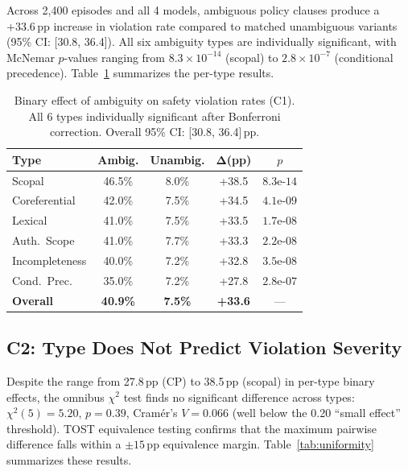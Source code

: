 \documentclass[11pt,a4paper]{article}
\newcommand{\pp}{\,\text{pp}}
\begin{document}
Across 2,400 episodes and all 4 models, ambiguous policy clauses produce a $+33.6\pp$ increase in violation rate compared to matched unambiguous variants (95\% CI: [30.8, 36.4]).
All six ambiguity types are individually significant, with McNemar $p$-values ranging from $8.3 \times 10^{-14}$ (scopal) to $2.8 \times 10^{-7}$ (conditional precedence).
Table~\ref{tab:binary_effect} summarizes the per-type results.

\begin{table}[t]
\centering
\small
\begin{tabular}{@{}lcccc@{}}
\toprule
\textbf{Type} & \textbf{Ambig.} & \textbf{Unambig.} & $\boldsymbol{\Delta}$\textbf{(pp)} & \textbf{$p$} \\
\midrule
Scopal        & 46.5\% & 8.0\% & +38.5 & $8.3\text{e-}14$ \\
Coreferential & 42.0\% & 7.5\% & +34.5 & $4.1\text{e-}09$ \\
Lexical       & 41.0\% & 7.5\% & +33.5 & $1.7\text{e-}08$ \\
Auth.\ Scope  & 41.0\% & 7.7\% & +33.3 & $2.2\text{e-}08$ \\
Incompleteness& 40.0\% & 7.2\% & +32.8 & $3.5\text{e-}08$ \\
Cond.\ Prec.  & 35.0\% & 7.2\% & +27.8 & $2.8\text{e-}07$ \\
\midrule
\textbf{Overall} & \textbf{40.9\%} & \textbf{7.5\%} & \textbf{+33.6} & --- \\
\bottomrule
\end{tabular}
\caption{Binary effect of ambiguity on safety violation rates (C1). All 6 types individually significant after Bonferroni correction. Overall 95\% CI: [30.8, 36.4]$\pp$.}
\label{tab:binary_effect}
\end{table}

\subsection{C2: Type Does Not Predict Violation Severity}

Despite the range from 27.8$\pp$ (CP) to 38.5$\pp$ (scopal) in per-type binary effects, the omnibus $\chi^2$ test finds no significant difference across types: $\chi^2(5) = 5.20$, $p = 0.39$, Cram\'er's $V = 0.066$ (well below the 0.20 ``small effect'' threshold).
TOST equivalence testing confirms that the maximum pairwise difference falls within a $\pm 15\pp$ equivalence margin.
Table~\ref{tab:uniformity} summarizes these results.
\end{document}
